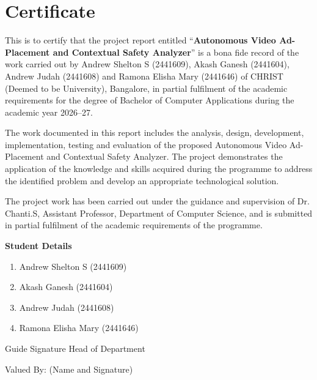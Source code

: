 \documentclass[
12pt,
a4paper,
oneside
]{report}
\begin{document}

\chapter*{Certificate}

This is to certify that the project report entitled ``\textbf{Autonomous Video
Ad-Placement and Contextual Safety Analyzer}'' is a bona fide record of the work
carried out by Andrew Shelton S (2441609), Akash Ganesh (2441604), Andrew Judah
(2441608) and Ramona Elisha Mary (2441646) of CHRIST (Deemed to be University),
Bangalore, in partial fulfilment of the academic requirements for the degree of
Bachelor of Computer Applications during the academic year 2026--27.

The work documented in this report includes the analysis, design, development,
implementation, testing and evaluation of the proposed Autonomous Video
Ad-Placement and Contextual Safety Analyzer. The project demonstrates the
application of the knowledge and skills acquired during the programme to address
the identified problem and develop an appropriate technological solution.

The project work has been carried out under the guidance and supervision of
Dr. Chanti.S, Assistant Professor, Department of Computer Science, and is
submitted in partial fulfilment of the academic requirements of the programme.

\vspace{0.6cm}

\noindent\textbf{Student Details}

\begin{enumerate}[itemsep=2pt]
\item Andrew Shelton S (2441609)
\item Akash Ganesh (2441604)
\item Andrew Judah (2441608)
\item Ramona Elisha Mary (2441646)
\end{enumerate}

\vspace{2.5cm}

\noindent
Guide Signature
\hfill
Head of Department

\vspace{1.5cm}
\noindent
Valued By: (Name and Signature)\\
\end{document}
